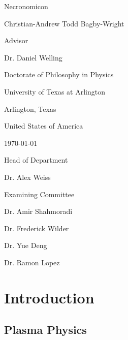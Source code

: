 \documentclass[utf8]{report}
\begin{document}
\vspace*{\fill}
\begin{center}
\begin{Huge}
Necronomicon
\end{Huge}

\begin{huge}
Christian-Andrew Todd Bagby-Wright
\end{huge}

\begin{normalsize}
Advisor
\end{normalsize}

\begin{Large}
Dr. Daniel Welling

Doctorate of Philosophy in Physics

University of Texas at Arlington

Arlington, Texas

United States of America

\today

\begin{normalsize}
Head of Department
\end{normalsize}

Dr. Alex Weiss

\begin{normalsize}
Examining Committee
\end{normalsize}

Dr. Amir Shahmoradi

Dr. Frederick Wilder

Dr. Yue Deng

Dr. Ramon Lopez

\end{Large}
\end{center}
\vspace*{\fill}
\newpage
\tableofcontents
\listoffigures
\newpage

\chapter{Introduction}
\section{Plasma Physics}
\end{document}
